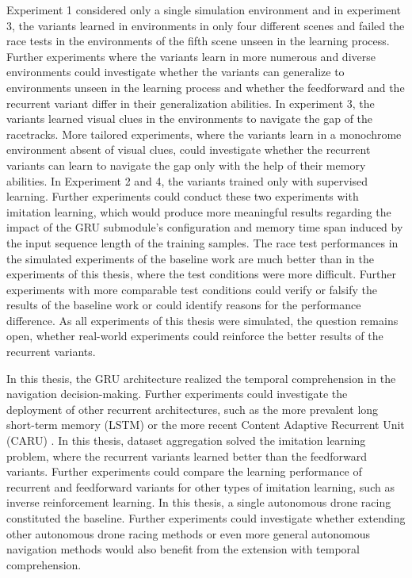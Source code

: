 Experiment 1 considered only a single simulation environment and in experiment 3, 
the variants learned in environments in only four different scenes and 
failed the race tests in the environments of the fifth scene unseen in the learning process. 
Further experiments where the variants learn in more numerous and diverse environments 
could investigate whether the variants can generalize to environments unseen in the learning process and 
whether the feedforward and the recurrent variant differ in their generalization abilities. 
In experiment 3, the variants learned visual clues in the environments to navigate the gap of the racetracks. 
More tailored experiments, where the variants learn in a monochrome environment absent of visual clues, 
could investigate whether the recurrent variants can learn 
to navigate the gap only with the help of their memory abilities. 
In Experiment 2 and 4, the variants trained only with supervised learning. 
Further experiments could conduct these two experiments with imitation learning, 
which would produce more meaningful results regarding the impact of the GRU submodule's configuration and 
memory time span induced by the input sequence length of the training samples. 
The race test performances in the simulated experiments of the baseline work are much better 
than in the experiments of this thesis, where the test conditions were more difficult. 
Further experiments with more comparable test conditions could verify or falsify the results of the baseline work or 
could identify reasons for the performance difference. 
As all experiments of this thesis were simulated, the question remains open, 
whether real-world experiments could reinforce the better results of the recurrent variants. 

In this thesis, the GRU architecture realized the temporal comprehension in the navigation decision-making. 
Further experiments could investigate the deployment of other recurrent architectures, 
such as the more prevalent long short-term memory (LSTM) \cite{Hochreiter1997}
or the more recent Content Adaptive Recurrent Unit (CARU) \cite{Chan2020}. 
In this thesis, dataset aggregation solved the imitation learning problem, 
where the recurrent variants learned better than the feedforward variants. 
Further experiments could compare the learning performance of recurrent and feedforward variants 
for other types of imitation learning, such as inverse reinforcement learning. 
In this thesis, a single autonomous drone racing constituted the baseline. 
Further experiments could investigate whether extending other autonomous drone racing methods 
or even more general autonomous navigation methods would also benefit from the extension with temporal comprehension.





